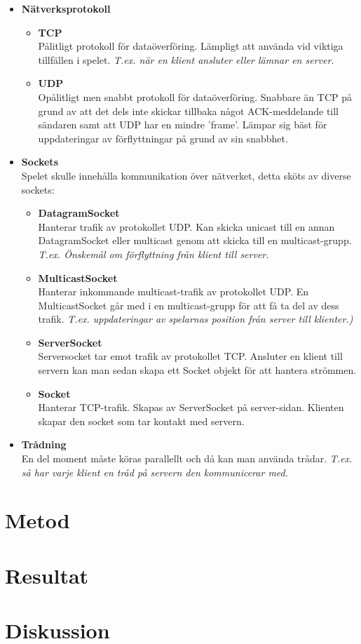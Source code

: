 \documentclass[10pt, titlepage, oneside, a4paper]{article}
\begin{document}
        \begin{itemize}
        	\item \textbf{Nätverksprotokoll} 
        		\begin{itemize}
        			\item \textbf{TCP} \\ Pålitligt protokoll för dataöverföring. Lämpligt att använda vid viktiga tillfällen i spelet. \textit{T.ex. när en klient ansluter eller lämnar en server.}
        			\item \textbf{UDP} \\ Opålitligt men snabbt protokoll för dataöverföring. Snabbare än TCP på grund av att det dels inte skickar tillbaka något ACK-meddelande till sändaren samt att UDP har en mindre 'frame'. Lämpar sig bäst för uppdateringar av förflyttningar på grund av sin snabbhet.
        		\end{itemize}
            \item \textbf{Sockets} \\
            Spelet skulle innehålla kommunikation över nätverket, detta sköts av diverse sockets:
            	\begin{itemize}
            		\item \textbf{DatagramSocket} \\Hanterar trafik av protokollet UDP. Kan skicka unicast till en annan DatagramSocket eller multicast genom att skicka till en multicast-grupp. \textit{T.ex. Önskemål om förflyttning från klient till server.}
            		
            		\item \textbf{MulticastSocket} \\Hanterar inkommande multicast-trafik av protokollet UDP. En MulticastSocket går med i en multicast-grupp för att få ta del av dess trafik. \textit{T.ex. uppdateringar av spelarnas position från server till klienter.)}
            		\item \textbf{ServerSocket} \\Serversocket tar emot trafik av protokollet TCP. Ansluter en klient till servern kan man sedan skapa ett Socket objekt för att hantera strömmen.
            		\item \textbf{Socket} \\ Hanterar TCP-trafik. Skapas av ServerSocket på server-sidan. Klienten skapar den socket som tar kontakt med servern.
            		
            	\end{itemize}
          	
			\item \textbf{Trådning} \\En del moment måste köras parallellt och då kan man använda trådar. \textit{T.ex. så har varje klient en tråd på servern den kommunicerar med.}
        \end{itemize}
        \newpage
        
	\section{Metod}
	\section{Resultat}
	\section{Diskussion}
    
    
\end{document}
